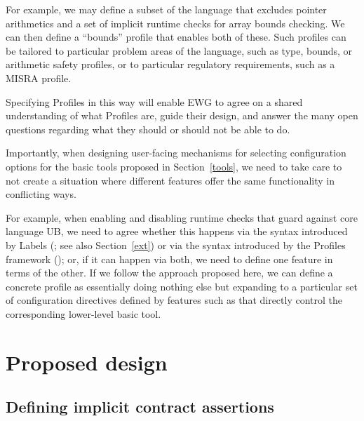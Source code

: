 For example, we may define a subset of the language that excludes pointer arithmetics and a set of implicit runtime checks for array bounds checking. We can then define a ``bounds'' profile that enables both of these. Such profiles can be tailored to particular problem areas of the language, such as type, bounds, or arithmetic safety profiles, or to particular regulatory requirements, such as a MISRA profile.

Specifying Profiles in this way will enable EWG to agree on a shared understanding of what Profiles are, guide their design, and answer the many open questions regarding what they should or should not be able to do. %


Importantly, when designing user-facing mechanisms for selecting configuration options for the basic tools proposed in Section~\ref{tools}, we need to take care to not create a situation where different features offer the same functionality in conflicting ways.

For example, when enabling and disabling runtime checks that guard against core language UB, we need to agree whether this happens via the syntax introduced by Labels (\cite{P3400R1}; see also Section~\ref{ext}) or via the syntax introduced by the Profiles framework (\cite{P3589R2}); or, if it can happen via both, we need to define one feature in terms of the other. If we follow the approach proposed here, we can define a concrete profile as essentially doing nothing else but expanding to a particular set of configuration directives defined by features such as \cite{P3400R1} that directly control the corresponding lower-level basic tool.

\section{Proposed design}
\label{design}

\subsection{Defining implicit contract assertions}
\label{defineicas}

